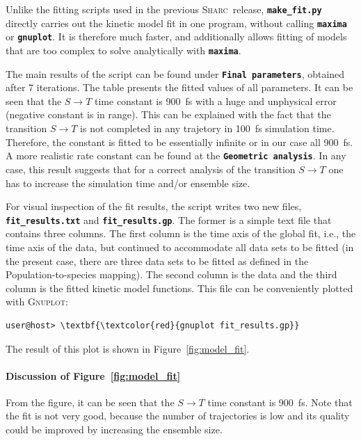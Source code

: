 \documentclass[a4paper,11pt,DIV=15,openany]{scrbook}
\newcommand{\sharc}{\textsc{Sharc}}
\newcommand{\ttt}[1]{\textbf{\texttt{#1}}}
\begin{document}
\normalsize

Unlike the fitting scripts used in the previous \sharc\ release, \ttt{make\_fit.py} directly carries out the kinetic model fit in one program, without calling \ttt{maxima} or \ttt{gnuplot}.
It is therefore much faster, and additionally allows fitting of models that are too complex to solve analytically with \ttt{maxima}.

The main results of the script can be found under \ttt{Final parameters}, obtained after 7 iterations.
The table presents the fitted values of all parameters.
It can be seen that the $S\rightarrow T$ time constant is 900~fs with a huge and unphysical error (negative constant is in range). This can be explained with the fact that the transition $S\rightarrow T$ is not completed in any trajetory in 100~fs simulation time. Therefore, the constant is fitted to be essentially infinite or in our case all 900~fs. A more realistic rate constant can be found at the \ttt{Geometric analysis}. In any case, this result suggests that for a correct analysis of the transition $S\rightarrow T$ one has to increase the simulation time and/or ensemble size.

For visual inspection of the fit results, the script writes two new files, \ttt{fit\_results.txt} and \ttt{fit\_results.gp}.
The former is a simple text file that contains three columns.
The first column is the time axis of the global fit, i.e., the time axis of the data, but continued to accommodate all data sets to be fitted (in the present case, there are three data sets to be fitted as defined in the Population-to-species mapping).
The second column is the data and the third column is the fitted kinetic model functions.
This file can be conveniently plotted with \textsc{Gnuplot}:
\begin{Verbatim}[commandchars=\\\{\}]
user@host> \textbf{\textcolor{red}{gnuplot fit_results.gp}}
\end{Verbatim}
The result of this plot is shown in Figure~\ref{fig:model_fit}.


\paragraph{Discussion of Figure~\ref{fig:model_fit}}

From the figure, it can be seen that the $S\rightarrow T$ time constant is 900~fs.
Note that the fit is not very good, because the number of trajectories is low and its quality could be improved by increasing the ensemble size.
\end{document}
